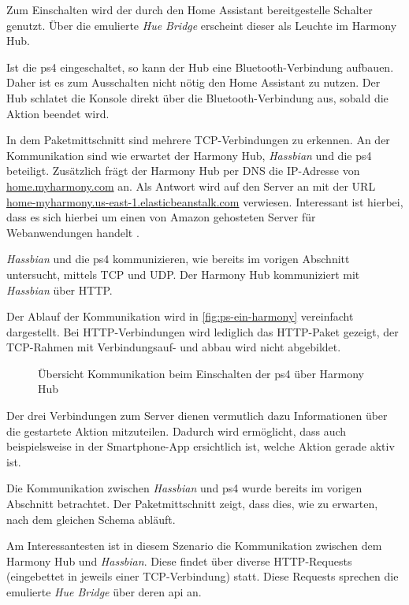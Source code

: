 Zum Einschalten wird der durch den Home Assistant bereitgestelle Schalter genutzt.
Über die emulierte \textit{Hue Bridge} erscheint dieser als Leuchte im Harmony Hub.

Ist die \ac{ps4} eingeschaltet, so kann der Hub eine Bluetooth-Verbindung aufbauen.
Daher ist es zum Ausschalten nicht nötig den Home Assistant zu nutzen.
Der Hub schlatet die Konsole direkt über die Bluetooth-Verbindung aus, sobald die Aktion beendet wird.

In dem Paketmittschnitt sind mehrere TCP-Verbindungen zu erkennen.
An der Kommunikation sind wie erwartet der Harmony Hub, \textit{Hassbian} und die \ac{ps4} beteiligt.
Zusätzlich frägt der Harmony Hub per DNS die IP-Adresse von \url{home.myharmony.com} an.
Als Antwort wird auf den Server an mit der URL \url{home-myharmony.us-east-1.elasticbeanstalk.com} verwiesen.
Interessant ist hierbei,
dass es sich hierbei um einen von Amazon gehosteten Server für Webanwendungen handelt \cite{AWSElast48:online}.

\textit{Hassbian} und die \ac{ps4} kommunizieren, wie bereits im vorigen Abschnitt untersucht, mittels TCP und UDP.
Der Harmony Hub kommuniziert mit \textit{Hassbian} über HTTP.

Der Ablauf der Kommunikation wird in \autoref{fig:ps-ein-harmony} vereinfacht dargestellt.
Bei HTTP-Verbindungen wird lediglich das HTTP-Paket gezeigt, der TCP-Rahmen mit Verbindungsauf- und abbau wird nicht abgebildet.

\begin{figure}[ht!]
    \centering
    \resizebox{\textwidth}{!}{
        
    }
    \caption{Übersicht Kommunikation beim Einschalten der \ac{ps4} über Harmony Hub}
    \label{fig:ps-ein-harmony}
\end{figure}

Der drei Verbindungen zum Server dienen vermutlich dazu Informationen über die gestartete Aktion mitzuteilen.
Dadurch wird ermöglicht, dass auch beispielsweise in der Smartphone-App ersichtlich ist, welche Aktion gerade aktiv ist.

Die Kommunikation zwischen \textit{Hassbian} und \ac{ps4} wurde bereits im vorigen Abschnitt betrachtet.
Der Paketmittschnitt zeigt, dass dies, wie zu erwarten, nach dem gleichen Schema abläuft.

Am Interessantesten ist in diesem Szenario die Kommunikation zwischen dem Harmony Hub und \textit{Hassbian}.
Diese findet über diverse HTTP-Requests (eingebettet in jeweils einer TCP-Verbindung) statt.
Diese Requests sprechen die emulierte \textit{Hue Bridge} über deren \ac{api} an.

